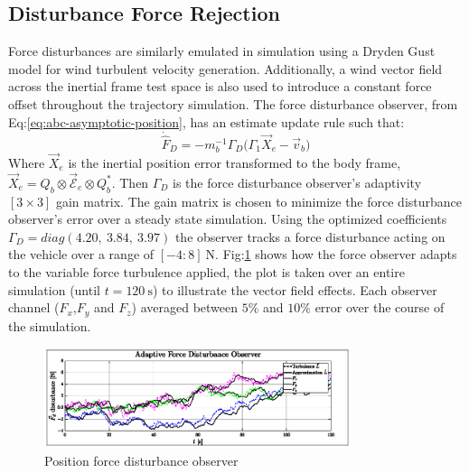 \subsection{Disturbance Force Rejection}
\label{subsec:simulation.disturbance.force}
Force disturbances are similarly emulated in simulation using a Dryden Gust model for wind turbulent velocity generation. Additionally, a wind vector field across the inertial frame test space is also used to introduce a constant force offset throughout the trajectory simulation. The force disturbance observer, from Eq:\ref{eq:abc-asymptotic-position}, has an estimate update rule such that:
\begin{equation}
\dot{\hat{F}}_D=-m_b^{-1}\Gamma_D\Big(\Gamma_1\vec{X}_e-\vec{v}_b\Big)
\end{equation}
Where $\vec{X}_e$ is the inertial position error transformed to the body frame, $\vec{X}_e=Q_b\otimes\vec{\mathcal{E}}_e\otimes Q_b^*$. Then $\Gamma_D$ is the force disturbance observer's adaptivity $[3\times 3]$ gain matrix. The gain matrix is chosen to minimize the force disturbance observer's error over a steady state simulation. Using the optimized coefficients $\Gamma_D=diag(4.20,~3.84,~3.97)$ the observer tracks a force disturbance acting on the vehicle over a range of $[-4:8]~\text{N}$. Fig:\ref{fig:force-observer} shows how the force observer adapts to the variable force turbulence applied, the plot is taken over an entire simulation (until $t=120~\text{s}$) to illustrate the vector field effects. Each observer channel ($F_x$,$F_y$ and $F_z$) averaged between $5\%$ and $10\%$ error over the course of the simulation.
\begin{figure}[hbtp]
\vspace{-6pt}
\centering
\includegraphics[width=0.8\textwidth]{graphs/force-observer}
\vspace{-10pt}
\caption{Position force disturbance observer}
\label{fig:force-observer}
\vspace{-18pt}
\end{figure}
\par
